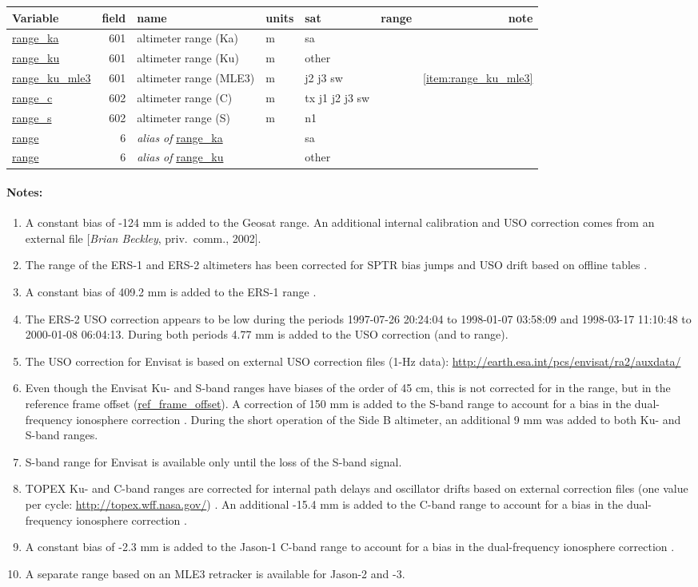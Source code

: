 \documentclass[a4paper,11pt,openany,natbib,nomargin]{thesis}
\makeatletter
\newcommand\var[1]{\url{#1}\index{variables!#1@\protect\url{#1}}}
\newcommand\alias[1]{\emph{alias of} \var{#1}}
\newenvironment{vartable}{
\begin{table}[ht]
\small
\begin{tabular}{lrllllr}
\hline
Variable & field & name & units & sat & range & note \\
\hline
}{
\hline
\end{tabular}
\end{table}
}
\newenvironment{notes}[1][Notes:]{\FloatBarrier\paragraph{#1}\begin{enumerate}}{\end{enumerate}}
\makeatother
\begin{document}
\begin{vartable}
\var{range_ka} & 601 & altimeter range (Ka) & m & sa & & \\
\var{range_ku} & 601 & altimeter range (Ku) & m & other & & \\
\var{range_ku_mle3} & 601 & altimeter range (MLE3) & m & j2 j3 sw & & \ref{item:range_ku_mle3} \\
\var{range_c}  & 602 & altimeter range (C) & m & tx j1 j2 j3 sw & & \\
\var{range_s}  & 602 & altimeter range (S) & m & n1 & & \\
\hline
\var{range} & 6 & \alias{range_ka} & & sa & & \\
\var{range} & 6 & \alias{range_ku} & & other & & \\
\end{vartable}

\begin{notes}
\item A constant bias of -124 mm is added to the Geosat range. An additional internal calibration and USO correction comes from an external file [\emph{Brian Beckley}, priv.\ comm., 2002].
\item The range of the ERS-1 and ERS-2 altimeters has been corrected for SPTR bias jumps and USO drift based on offline tables \citep{martini2000}.
\item A constant bias of 409.2 mm is added to the ERS-1 range \citep{francis1993b,stum1998a}.
\item The ERS-2 USO correction appears to be low during the periods 1997-07-26 20:24:04 to 1998-01-07 03:58:09 and 1998-03-17 11:10:48 to 2000-01-08 06:04:13. During both periods 4.77 mm is added to the USO correction (and to range).
\item The USO correction for Envisat is based on external USO correction files (1-Hz data): \url{http://earth.esa.int/pcs/envisat/ra2/auxdata/}
\item Even though the Envisat Ku- and S-band ranges have biases of the order of 45 cm, this is not corrected for in the range, but in the reference frame offset (\var{ref_frame_offset}). A correction of 150 mm is added to the S-band range to account for a bias in the dual-frequency ionosphere correction \citep{scharroo2010a}. During the short operation of the Side B altimeter, an additional 9 mm was added to both Ku- and S-band ranges.
\item S-band range for Envisat is available only until the loss of the S-band signal.
\item TOPEX Ku- and C-band ranges are corrected for internal path delays and oscillator drifts based on external correction files (one value per cycle: \url{http://topex.wff.nasa.gov/}) \citep{hayne1994}. An additional -15.4 mm is added to the C-band range to account for a bias in the dual-frequency ionosphere correction \citep{scharroo2010a}.
\item A constant bias of -2.3 mm is added to the Jason-1 C-band range to account for a bias in the dual-frequency ionosphere correction \citep{scharroo2010a}.
\item A separate range based on an MLE3 retracker is available for Jason-2 and -3.\label{item:range_ku_mle3}
\end{notes}
\end{document}

